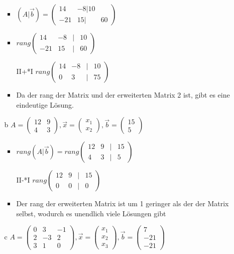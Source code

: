 \documentclass{article}
\begin{document}
\begin{itemize}
\begin{itemize}
			\begin{itemize}
				\item{$(A|\vec{b})=\begin{pmatrix} 14 & -8 | 10 \\ -21 & 15 | & 60 \end{pmatrix}$}
				\item{$rang \begin{pmatrix} 14 & -8 & | & 10 \\ -21 & 15 & | & 60 \end{pmatrix}$}
				\item[II+\nicefrac{3}{2}*I]{$rang \begin{pmatrix} 14 & -8 & | & 10 \\ 0 & 3 & | & 75 \end{pmatrix}$}
				\item{Da der rang der Matrix und der erweiterten Matrix 2 ist, gibt es eine eindeutige Lösung.}
			\end{itemize}
			\item[b]{$A=\begin{pmatrix} 12 & 9 \\ 4 & 3 \end{pmatrix}, \vec{x}=\begin{pmatrix} x_1 \\ x_2 \end{pmatrix},\vec{b}=\begin{pmatrix} 15 \\ 5 \end{pmatrix}$}
			\begin{itemize}
				\item{$rang(A|\vec{b})=rang \begin{pmatrix} 12 & 9 & | & 15 \\ 4 & 3 & | & 5 \end{pmatrix}$}
				\item[II-\nicefrac{1}{3}*I]{$rang \begin{pmatrix} 12 & 9 & | & 15 \\ 0 & 0 & | & 0 \end{pmatrix}$}
				\item{Der rang der erweiterten Matrix ist um 1 geringer als der der Matrix selbst, wodurch es unendlich viele Lösungen gibt}
			\end{itemize}
			\item[c]{$A=\begin{pmatrix} 0 & 3 & -1 \\ 2 & -3 & 2 \\ 3 & 1 & 0 \end{pmatrix}, \vec{x}=\begin{pmatrix} x_1 \\ x_2 \\ x_3 \end{pmatrix}, \vec{b}=\begin{pmatrix} 7 \\ -21 \\ -21 \end{pmatrix}$}

\end{itemize}
\end{itemize}
\end{document}

